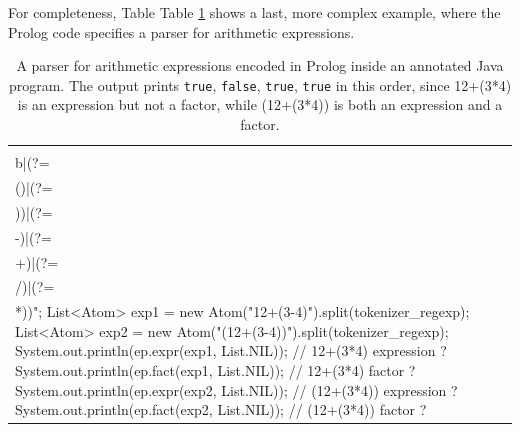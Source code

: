 For completeness, Table Table \ref{tab:pj-example4} shows a last, more complex example, where the Prolog code specifies a parser for arithmetic expressions.

\begin{table}
{\footnotesize
\begin{tabular}[-1cm]{p{12cm}}
\begin{verbatim}
import alice.tuprologx.pj.annotations.*;
import alice.tuprologx.pj.engine.*;
import alice.tuprologx.pj.model.*;
import alice.tuprologx.pj.meta.*;

@PrologClass
public abstract class PJParser {
  @PrologMethod (clauses={"expr(L,R):-term(L,R).",
                          "expr(L,R):-term(L,['+'|R2]), expr(R2,R).",
                          "expr(L,R):-term(L,['-'|R2]), expr(R2,R)."})
  public abstract <$E extends List<?>, $R extends List<?>>
  Boolean expr($E expr, $R rest);

  @PrologMethod (clauses={"term(L,R):-fact(L,R).",
                          "term(L,R):-fact(L,['*'|R2]), term(R2,R).",
                          "term(L,R):-fact(L,['/'|R2]), term(R2,R)."})
  public abstract <$T extends List<?>, $R extends List<?>>
  Boolean term($T term, $R rest);
	
  @PrologMethod (clauses={"fact(L,R):-num(L,R).",
                          "fact(['(' | E],R):-expr(E,[')'|R])."})
  public abstract <$F extends List<?>, $R extends List<?>>
  Boolean fact($F fact, $R rest);
	
  @PrologMethod (clauses={"num([L|R],R):-num_atom(_,L)."})
  public abstract <$N extends List<?>, $R extends List<?>>
  Boolean num($N num, $R rest);
	
  public static void main(String[] args) throws Exception {
    PJParser ep = PJ.newInstance(PJParser.class);
    String tokenizer_regexp =
      "(?<!^)(\\b|(?=\\()|(?=\\))|(?=\\-)|(?=\\+)|(?=\\/)|(?=\\*))";
    List<Atom> exp1 = new Atom("12+(3-4)").split(tokenizer_regexp);
    List<Atom> exp2 = new Atom("(12+(3-4))").split(tokenizer_regexp);
    System.out.println(ep.expr(exp1, List.NIL)); // 12+(3*4)   expression ?
    System.out.println(ep.fact(exp1, List.NIL)); // 12+(3*4)   factor ?
    System.out.println(ep.expr(exp2, List.NIL)); // (12+(3*4)) expression ?
    System.out.println(ep.fact(exp2, List.NIL)); // (12+(3*4)) factor ?
  }
}\end{verbatim}
\end{tabular}
}\caption{A parser for arithmetic expressions encoded in Prolog inside an annotated Java program. The output prints \texttt{true}, \texttt{false}, \texttt{true}, \texttt{true} in this order, since 12+(3*4) is an expression but not a factor, while (12+(3*4)) is both an expression and a factor.}
\label{tab:pj-example4}
\end{table} 

